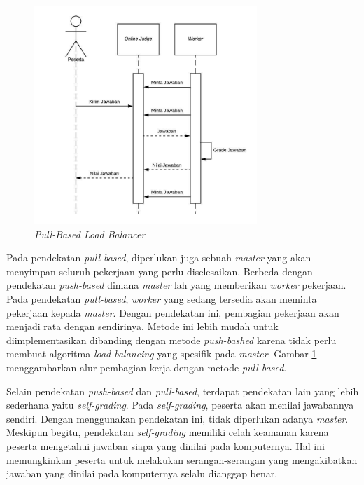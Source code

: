 \begin{figure}[ht!]
    \centering
    \includegraphics[width=0.75\textwidth]{images/load-balancing-pull}
    \caption{\textit{Pull-Based Load Balancer}}
    \label{fig:load-balancing-pull}
\end{figure}

\par Pada pendekatan \textit{pull-based}, diperlukan juga sebuah \textit{master} yang akan menyimpan seluruh pekerjaan yang perlu diselesaikan. Berbeda dengan pendekatan \textit{push-based} dimana \textit{master} lah yang memberikan \textit{worker} pekerjaan. Pada pendekatan \textit{pull-based}, \textit{worker} yang sedang tersedia akan meminta pekerjaan kepada \textit{master}. Dengan pendekatan ini, pembagian pekerjaan akan menjadi rata dengan sendirinya. Metode ini lebih mudah untuk diimplementasikan dibanding dengan metode \textit{push-bashed} karena tidak perlu membuat algoritma \textit{load balancing} yang spesifik pada \textit{master}. Gambar \ref{fig:load-balancing-pull} menggambarkan alur pembagian kerja dengan metode \textit{pull-based}.

\par Selain pendekatan \textit{push-based} dan \textit{pull-based}, terdapat pendekatan lain yang lebih sederhana yaitu \textit{self-grading}. Pada \textit{self-grading}, peserta akan menilai jawabannya sendiri. Dengan menggunakan pendekatan ini, tidak diperlukan adanya \textit{master}. Meskipun begitu, pendekatan \textit{self-grading} memiliki celah keamanan karena peserta mengetahui jawaban siapa yang dinilai pada komputernya. Hal ini memungkinkan peserta untuk melakukan serangan-serangan yang mengakibatkan jawaban yang dinilai pada komputernya selalu dianggap benar.

